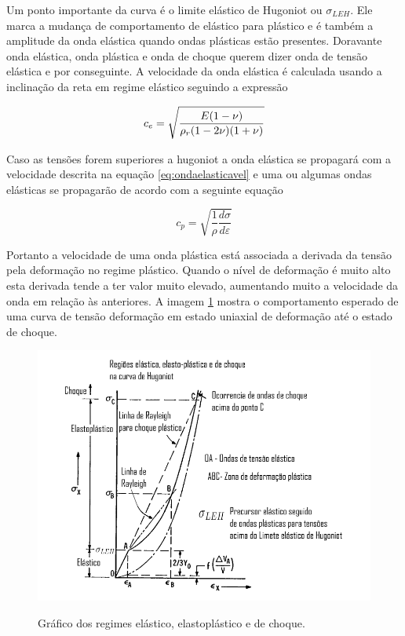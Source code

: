  Um ponto importante da curva é o limite elástico de Hugoniot ou $\sigma_{LEH} $. Ele marca a mudança de comportamento de elástico para plástico e é também a amplitude da onda elástica quando ondas plásticas estão presentes. Doravante onda elástica, onda plástica e onda de choque querem dizer onda de tensão elástica e por conseguinte. A velocidade da onda elástica é calculada usando a inclinação da reta em regime elástico seguindo a expressão
 
 \begin{equation} \label{eq:ondaelasticavel}
     c_{e} = \sqrt{\frac{\displaystyle E(1- \nu )}{\displaystyle \rho_r (1 - 2\nu )(1+ \nu)}} 
 \end{equation}
 
 Caso as tensões forem superiores a \gls{hugoniot} a onda elástica se propagará com a velocidade descrita na equação \ref{eq:ondaelasticavel} e uma ou algumas ondas elásticas se propagarão de acordo com a seguinte equação
 
 \begin{equation} \label{eq:ondaplasticavel}
     c_{p} = \sqrt{\frac{1}{\rho} \frac{d \sigma}{d \varepsilon}}
 \end{equation}
 
 Portanto a velocidade de uma onda plástica está associada a derivada da tensão pela deformação no regime plástico. Quando o nível de deformação é muito alto esta derivada tende a ter valor muito elevado, aumentando muito a velocidade da onda em relação às anteriores. A imagem \ref{fig:elastochoque} mostra  o comportamento esperado de uma curva de tensão deformação em estado uniaxial de deformação até o estado de choque. \\
 
 
 \begin{figure} [H]
     \centering
     \caption{Gráfico dos regimes elástico, elastoplástico e de choque.}
     \includegraphics[width=0.5\linewidth]{images/elasticplasticshock.png}
     \label{fig:elastochoque}
 \end{figure}
 
